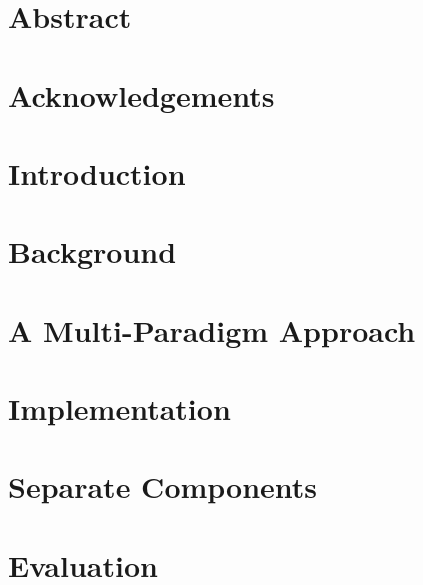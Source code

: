 \documentclass[11pt]{article}
\begin{document}

\clearpage

\onehalfspacing{}

\section*{Abstract}
\clearpage

\section*{Acknowledgements}
\clearpage

\tableofcontents
\clearpage

\section{Introduction}
\label{sec:intro}


\section{Background}
\label{sec:background}


\section{A Multi-Paradigm Approach}
\label{sec:design}


\section{Implementation}
\label{sec:implementation}


\section{Separate Components}
\label{sec:separate-components}


\section{Evaluation}



\end{document}

